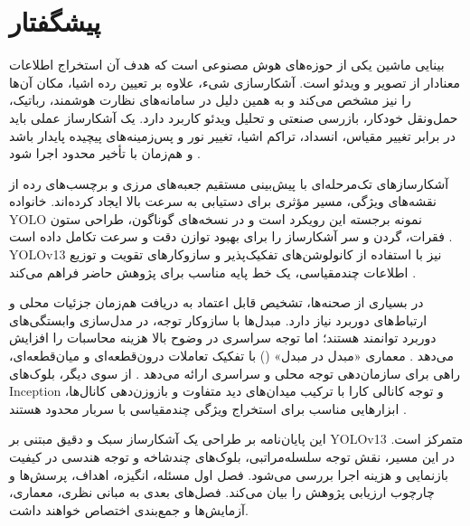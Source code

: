 \chapter*{پیشگفتار}
{}

بینایی ماشین یکی از حوزه‌های هوش مصنوعی است که هدف آن استخراج اطلاعات معنادار از تصویر و ویدئو است. آشکارسازی شیء، علاوه بر تعیین رده اشیا، مکان آن‌ها را نیز مشخص می‌کند و به همین دلیل در سامانه‌های نظارت هوشمند، رباتیک، حمل‌ونقل خودکار، بازرسی صنعتی و تحلیل ویدئو کاربرد دارد. یک آشکارساز عملی باید در برابر تغییر مقیاس، انسداد، تراکم اشیا، تغییر نور و پس‌زمینه‌های پیچیده پایدار باشد و هم‌زمان با تأخیر محدود اجرا شود \cite{lin2014coco,ren2015faster}.

آشکارسازهای تک‌مرحله‌ای با پیش‌بینی مستقیم جعبه‌های مرزی و برچسب‌های رده از نقشه‌های ویژگی، مسیر مؤثری برای دستیابی به سرعت بالا ایجاد کرده‌اند. خانواده YOLO نمونه برجسته این رویکرد است و در نسخه‌های گوناگون، طراحی ستون فقرات، گردن و سر آشکارساز را برای بهبود توازن دقت و سرعت تکامل داده است \cite{redmon2016yolo,liu2016ssd}. YOLOv13 نیز با استفاده از کانولوشن‌های تفکیک‌پذیر و سازوکارهای تقویت و توزیع اطلاعات چندمقیاسی، یک خط پایه مناسب برای پژوهش حاضر فراهم می‌کند \cite{lei2025yolov13}.

در بسیاری از صحنه‌ها، تشخیص قابل اعتماد به دریافت هم‌زمان جزئیات محلی و ارتباط‌های دوربرد نیاز دارد. مبدل‌ها با سازوکار توجه، در مدل‌سازی وابستگی‌های دوربرد توانمند هستند؛ اما توجه سراسری در وضوح بالا هزینه محاسبات را افزایش می‌دهد \cite{vaswani2017attention,dosovitskiy2021vit}. معماری «مبدل در مبدل» () با تفکیک تعاملات درون‌قطعه‌ای و میان‌قطعه‌ای، راهی برای سازمان‌دهی توجه محلی و سراسری ارائه می‌دهد \cite{han2021tnt}. از سوی دیگر، بلوک‌های Inception و توجه کانالی کارا با ترکیب میدان‌های دید متفاوت و بازوزن‌دهی کانال‌ها، ابزارهایی مناسب برای استخراج ویژگی چندمقیاسی با سربار محدود هستند \cite{szegedy2015inception,wang2020eca}.

این پایان‌نامه بر طراحی یک آشکارساز سبک و دقیق مبتنی بر YOLOv13 متمرکز است. در این مسیر، نقش توجه سلسله‌مراتبی، بلوک‌های چندشاخه و توجه هندسی در کیفیت بازنمایی و هزینه اجرا بررسی می‌شود. فصل اول مسئله، انگیزه، اهداف، پرسش‌ها و چارچوب ارزیابی پژوهش را بیان می‌کند. فصل‌های بعدی به مبانی نظری، معماری، آزمایش‌ها و جمع‌بندی اختصاص خواهند داشت.
